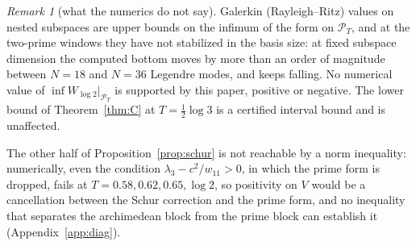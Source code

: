 \documentclass[11pt]{amsart}
\theoremstyle{definition}
\theoremstyle{remark}
\newtheorem{remark}[theorem]{Remark}
\newcommand{\PT}{\mathcal P_T}
\begin{document}
\begin{remark}[what the numerics do not say]\label{rem:galerkin}
Galerkin (Rayleigh--Ritz) values on nested subspaces are upper bounds on the infimum of the form on
$\PT$, and at the two-prime windows they have not stabilized in the basis size: at fixed subspace
dimension the computed bottom moves by more than an order of magnitude between $N=18$ and $N=36$
Legendre modes, and keeps falling. No numerical value of $\inf W_{\log2}|_{\PT}$ is supported by
this paper, positive or negative. The lower bound of Theorem~\ref{thm:C} at $T=\frac12\log3$ is a
certified interval bound and is unaffected.
\end{remark}

The other half of Proposition~\ref{prop:schur} is not reachable by a norm inequality: numerically, even the
condition $\lambda_3-c^2/w_{11}>0$, in which the prime form is dropped, fails at $T=0.58,0.62,0.65,\log2$, so
positivity on $V$ would be a cancellation between the Schur correction and the prime form, and no
inequality that separates the archimedean block from the prime block can establish it
(Appendix~\ref{app:diag}).
\end{document}
